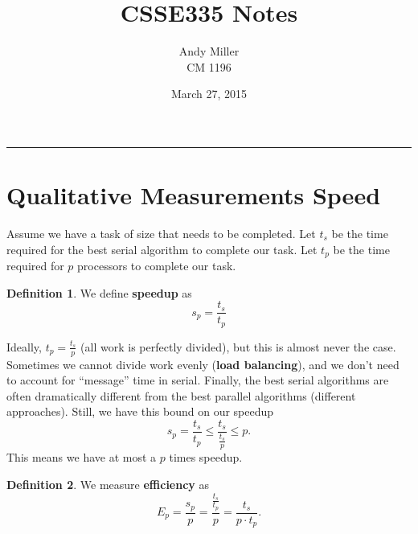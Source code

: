 \documentclass[12pt]{article}
\title{\textbf{CSSE335 Notes}}
\author{
        Andy Miller \\
        CM 1196 \\
}
\numberwithin{equation}{section}
\theoremstyle{theorem}
\theoremstyle{definition}
\newtheorem{definition}{Definition}[section]
\theoremstyle{remark}
\begin{document}
\maketitle
\tableofcontents
\noindent\rule{\textwidth}{0.4pt}
 
\date{March 27, 2015}
\section{Qualitative Measurements Speed}
Assume we have a task of size that needs to be completed.  Let $t_s$ be the time required for the best serial algorithm to complete our task.  Let $t_p$ be the time required for $p$ processors to complete our task.

\begin{definition} We define \textbf{speedup} as
\begin{equation}
s_p = \frac{t_s}{t_p}
\end{equation}
\end{definition}

Ideally, $t_p = \frac{t_s}{p}$ (all work is perfectly divided), but this is almost never the case. Sometimes we cannot divide work evenly (\textbf{load balancing}), and we don't need to account for ``message'' time in serial.  Finally, the best serial algorithms are often dramatically different from the best parallel algorithms (different approaches).  Still, we have this bound on our speedup
\begin{equation}
s_p = \frac{t_s}{t_p} \leq \frac{t_s}{\frac{t_s}{p}} \leq p.
\end{equation}
This means we have at most a $p$ times speedup.

\begin{definition} We measure \textbf{efficiency} as
\begin{equation}
E_p = \frac{s_p}{p} = \frac{\frac{t_s}{t_p}}{p} = \frac{t_s}{p\cdot t_p}.
\end{equation}
\end{definition}
\end{document}

